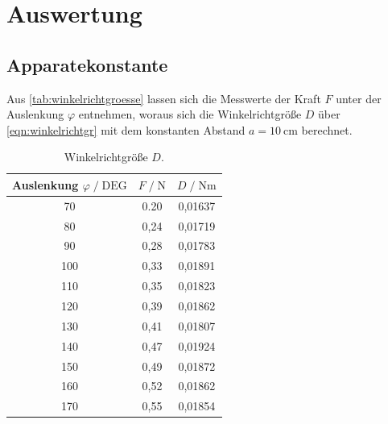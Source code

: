 \section{Auswertung}
\label{sec:Auswertung}



\subsection{Apparatekonstante}
\label{sec:Apparatekonstante}
Aus \autoref{tab:winkelrichtgroesse} lassen sich die Messwerte der Kraft $F$ unter der Auslenkung $\varphi$ entnehmen, woraus sich die
Winkelrichtgröße $D$ über \autoref{eqn:winkelrichtgr} mit dem konstanten Abstand $a=\SI{10}{\centi\meter}$ berechnet.


\begin{table}[H]
  \centering
  \caption{Winkelrichtgröße $D$.}
  \label{tab:winkelrichtgroesse}
  \begin{tabular}{c c c}
      \toprule
      Auslenkung $ \varphi \;/\; \text{DEG}$ & $F \;/\; \si{\newton}$ & $D \;/\; \si{\newton\meter}$\\
      \midrule
      70 & 0.20 & 0,01637 \\
      80 & 0,24 & 0,01719 \\
      90 & 0,28 & 0,01783 \\
      100 & 0,33 & 0,01891 \\
      110 & 0,35 & 0,01823 \\
      120 & 0,39 & 0,01862 \\ 
      130 & 0,41 & 0,01807 \\
      140 & 0,47 & 0,01924 \\
      150 & 0,49 & 0,01872 \\
      160 & 0,52 & 0,01862 \\
      170 & 0,55 & 0,01854 \\
      \bottomrule
  \end{tabular}
\end{table}

